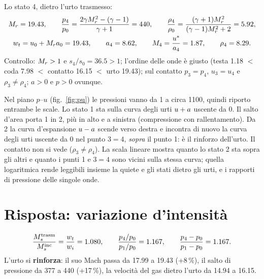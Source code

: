 Lo stato 4, dietro l'urto trasmesso:
\begin{gather*}
  M_{r}=\num{19.43},\qquad \frac{p_4}{p_0}=\frac{2\gamma M_{r}^2-(\gamma-1)}{\gamma+1}=\num{440},\qquad
  \frac{\rho_4}{\rho_0}=\frac{(\gamma+1)M_{r}^2}{(\gamma-1)M_{r}^2+2}=\num{5.92},\\
  w_t=u_0+M_{r} a_0=\num{19.43},\qquad a_4=\num{8.62},\qquad M_4=\frac{u^*}{a_4}=\num{1.87},\qquad \rho_4=\num{8.29}.
\end{gather*}
Controllo: $M_{r}>1$ e $s_4/s_0=\num{36.5}>1$; l'ordine delle onde è giusto (testa \num{1.18} $<$ coda \num{7.98} $<$
contatto \num{16.15} $<$ urto \num{19.43}); sul contatto $p_3=p_4$, $u_3=u_4$ e $\rho_3\neq\rho_4$; $a>0$ e $p>0$
ovunque.


Nel piano $p$--$u$ (fig.~\ref{fig:pu}) le pressioni vanno da 1 a circa \num{1100}, quindi riporto entrambe le scale. Lo
stato 1 sta sulla curva degli urti $u+a$ uscente da 0. Il salto d'area porta 1 in 2, più in alto e a sinistra
(compressione con rallentamento). Da 2 la curva d'espansione $u-a$ scende verso destra e incontra di nuovo la curva
degli urti uscente da 0 nel punto $3=4$, \emph{sopra} il punto 1: è il rinforzo dell'urto. Il contatto non si vede
($\rho_3\neq\rho_4$). La scala lineare mostra quanto lo stato 2 sta sopra gli altri e quanto i punti 1 e $3=4$ sono
vicini sulla stessa curva; quella logaritmica rende leggibili insieme la quiete e gli stati dietro gli urti, e i
rapporti di pressione delle singole onde.

\section*{Risposta: variazione d'intensità}
\[
  \frac{M_{s}^{\rm trasm}}{M_{s}^{\rm inc}}=\frac{w_t}{w_i}=\num{1.080},\qquad
  \frac{p_4/p_0}{p_1/p_0}=\num{1.167},\qquad
  \frac{p_4-p_0}{p_1-p_0}=\num{1.167}.
\]
L'urto si \textbf{rinforza}: il suo Mach passa da \num{17.99} a \num{19.43} (+8\,\%), il salto di pressione da
\num{377} a \num{440} (+17\,\%), la velocità del gas dietro l'urto da \num{14.94} a \num{16.15}.

